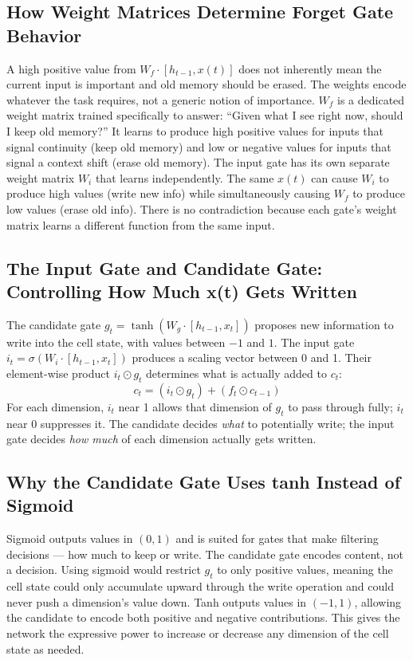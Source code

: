\documentclass[12pt,a4paper]{article}
\begin{document}
\subsection{How Weight Matrices Determine Forget Gate Behavior}
A high positive value from $W_f \cdot [h_{t-1}, x(t)]$ does not inherently mean the current input is important and old memory should be erased. The weights encode whatever the task requires, not a generic notion of importance. $W_f$ is a dedicated weight matrix trained specifically to answer: ``Given what I see right now, should I keep old memory?'' It learns to produce high positive values for inputs that signal continuity (keep old memory) and low or negative values for inputs that signal a context shift (erase old memory). The input gate has its own separate weight matrix $W_i$ that learns independently. The same $x(t)$ can cause $W_i$ to produce high values (write new info) while simultaneously causing $W_f$ to produce low values (erase old info). There is no contradiction because each gate's weight matrix learns a different function from the same input.

\subsection{The Input Gate and Candidate Gate: Controlling How Much x(t) Gets Written}
The candidate gate $g_t = \tanh(W_g \cdot [h_{t-1}, x_t])$ proposes new information to write into the cell state, with values between $-1$ and $1$. The input gate $i_t = \sigma(W_i \cdot [h_{t-1}, x_t])$ produces a scaling vector between 0 and 1. Their element-wise product $i_t \odot g_t$ determines what is actually added to $c_t$:
\[
c_t = (i_t \odot g_t) + (f_t \odot c_{t-1})
\]
For each dimension, $i_t$ near 1 allows that dimension of $g_t$ to pass through fully; $i_t$ near 0 suppresses it. The candidate decides \textit{what} to potentially write; the input gate decides \textit{how much} of each dimension actually gets written.

\subsection{Why the Candidate Gate Uses tanh Instead of Sigmoid}
Sigmoid outputs values in $(0, 1)$ and is suited for gates that make filtering decisions --- how much to keep or write. The candidate gate encodes content, not a decision. Using sigmoid would restrict $g_t$ to only positive values, meaning the cell state could only accumulate upward through the write operation and could never push a dimension's value down. Tanh outputs values in $(-1, 1)$, allowing the candidate to encode both positive and negative contributions. This gives the network the expressive power to increase or decrease any dimension of the cell state as needed.
\end{document}
